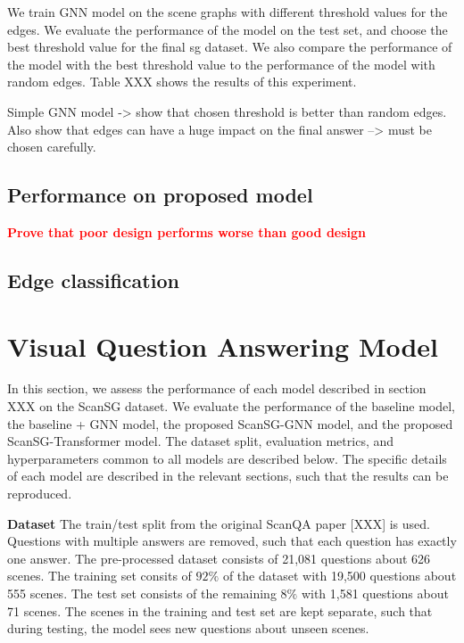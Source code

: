 We train GNN model on the scene graphs with different threshold values for the edges. We evaluate the performance of the model on the test set, and choose the best threshold value for the final sg dataset. We also compare the performance of the model with the best threshold value to the performance of the model with random edges. Table XXX shows the results of this experiment.

Simple GNN model -> show that chosen threshold is better than random edges.
Also show that edges can have a huge impact on the final answer --> must be chosen carefully.

\subsection{Performance on proposed model}
\textcolor{red}{\textbf{Prove that poor design performs worse than good design}}

\subsection{Edge classification}



\section{Visual Question Answering Model}

In this section, we assess the performance of each model described in section XXX on the ScanSG dataset. We evaluate the performance of the baseline model, the baseline + GNN model, the proposed ScanSG-GNN model, and the proposed ScanSG-Transformer model. The dataset split, evaluation metrics, and hyperparameters common to all models are described below. The specific details of each model are described in the relevant sections, such that the results can be reproduced.

\bigskip
\noindent \textbf{Dataset}
The train/test split from the original ScanQA paper [XXX] is used. Questions with multiple answers are removed, such that each question has exactly one answer. The pre-processed dataset consists of 21,081 questions about 626 scenes. The training set consits of $92\%$ of the dataset with 19,500 questions about 555 scenes. The test set consists of the remaining $8\%$ with 1,581 questions about 71 scenes. The scenes in the training and test set are kept separate, such that during testing, the model sees new questions about unseen scenes.


